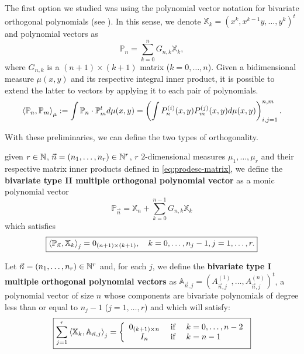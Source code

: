 \documentclass[portrait,final,a0paper,fontscale=0.38]{baposter}
\begin{document}
\begin{poster}
%
	{
  The first option we studied was using the polynomial vector notation for bivariate orthogonal polynomials (see \cite[Ch. III, Section 3.2]{xu}). In this sense, we denote $\mathbb X_k = (x^k, x^{k-1}y,\dots,y^k)^t$ and polynomial vectors as $$\mathbb P_n = \displaystyle\sum_{k=0}^n G_{n,k} \mathbb X_k,$$ where $G_{n,k}$ is a $(n+1)\times(k+1)$ matrix ($k=0,\dots,n$). Given a bidimensional measure $\mu(x,y)$ and its respective integral inner product, it is possible to extend the latter to vectors by applying it to each pair of polynomials.
  \begin{equation}
    \label{eq:prodesc-matrix}
    \left\langle \mathbb P_n , \mathbb P_m \right\rangle_\mu:= \int \mathbb P_n\cdot \mathbb P_m^t d\mu(x,y) = \left(\int P_n^{(i)}(x,y) P_m^{(j)}(x,y) d\mu(x,y)\right)_{i,j=1}^{n,m}.
  \end{equation}

  With these preliminaries, we can define the two types of orthogonality.
  \begin{definition}
    given $r\in\mathbb{N}$, $\vec n = (n_1,\dots, n_r)\in\mathbb{N}^r$, $r$ $2$-dimensional measures $\mu_1, \dots, \mu_r$ and their respective matrix inner products defined in \eqref{eq:prodesc-matrix}, we define the \textbf{bivariate type II multiple orthogonal polynomial vector} as a monic polynomial vector $$\mathbb P_{\vec n} = \mathbb X_n + \displaystyle\sum_{k=0}^{n-1}G_{n,k} \mathbb X_k$$ which satisfies
    \begin{equation}
        \label{eq:typeII-MOP-d-variables}
        \boxed{
        \left\langle \mathbb P_{\vec n} , \mathbb X_k \right\rangle_j = 0_{(n+1)\times (k+1)}, \ \ \ k=0,\dots,n_j-1, j=1,\dots,r.}
    \end{equation}    
  \end{definition}

  \begin{definition}
    Let $\vec n = (n_1,\dots,n_r)\in\mathbb{N}^r$ and, for each $j$, we define the \textbf{bivariate type I multiple orthogonal polynomial vectors} as $\mathbb A_{\vec n, j}= (A_{\vec n, j}^{(1)}, \dots, A_{\vec n, j}^{(n)})^t $, a polynomial vector of size $n$ whose components are bivariate polynomials of degree less than or equal to $n_j-1$ ($j=1,\dots,r$) and which will satisfy:
    \begin{equation}
      \label{eq:condition-type-I}
      \boxed{\sum_{j=1}^r \left\langle \mathbb X_k , \mathbb A_{\vec n,j} \right\rangle_j = \left\{\begin{array}{ccl}
          0_{(k+1)\times n} &   \text{ if } & k=0,\dots,n-2 \\
          I_n & \text{ if } & k=n-1      
      \end{array}\right.}
    \end{equation}
  \end{definition}
  
}
\end{poster}
\end{document}
